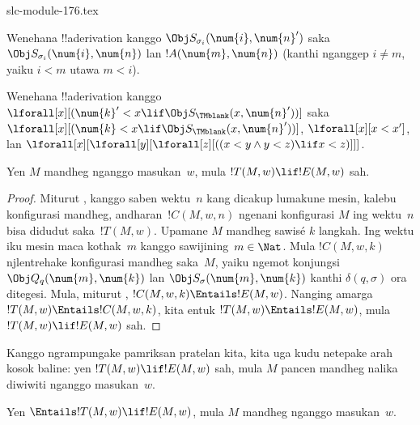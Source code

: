 \begin{filecontents*}[overwrite]{slc-module-176.tex}
\begin{prob}
 Wenehana !!a{derivation} kanggo
$\Obj S_{\sigma_i}(\num{i}, \num{n}')$
saka $\Obj S_{\sigma_i}(\num{i}, \num{n})$
lan $!A(\num{m}, \num{n})$ (kanthi nganggep $i \neq m$,
yaiku $i < m$ utawa $m < i$).
\end{prob}

\begin{prob}
Wenehana !!a{derivation} kanggo
$\lforall[x][(\num{k}' < x \lif \Obj
  S_\TMblank(x, \num{n}'))]$ saka
$\lforall[x][(\num{k} < x \lif \Obj
  S_\TMblank(x, \num{n}'))]$,
$\lforall[x][x < x']$, lan
$\lforall[x][\lforall[y][\lforall[z][ ((x < y \land y < z) \lif x <
      z)]]]$.
\end{prob}


\begin{lem}
Yen $M$ mandheg nganggo masukan~$w$,
mula $!T(M, w) \lif !E(M, w)$ sah.
\end{lem}

\begin{proof}
Miturut , kanggo saben
wektu~$n$ kang dicakup lumakune mesin, kalebu konfigurasi mandheg, andharan~$!C(M, w, n)$
ngenani konfigurasi $M$ ing wektu~$n$
bisa didudut saka~$!T(M, w)$.
Upamane $M$ mandheg sawisé $k$ langkah.
Ing wektu iku mesin maca kothak~$m$
kanggo sawijining~$m \in \Nat$.
Mula $!C(M, w, k)$ njlentrehake
konfigurasi mandheg saka~$M$, yaiku
ngemot konjungsi $\Obj Q_q(\num{m}, \num{k})$
lan $\Obj S_\sigma(\num{m}, \num{k})$
kanthi $\delta(q,\sigma)$ ora ditegesi.
Mula, miturut ,
$!C(M, w, k) \Entails !E(M, w)$.
Nanging amarga $!T(M, w) \Entails !C(M, w, k)$,
kita entuk $!T(M, w) \Entails !E(M, w)$,
mula $!T(M, w) \lif !E(M, w)$ sah.
\end{proof}


\begin{explain} 
Kanggo ngrampungake pamriksan pratelan kita,
kita uga kudu netepake arah kosok baline:
yen $!T(M, w) \lif !E(M, w)$ sah,
mula $M$ pancen mandheg nalika diwiwiti
nganggo masukan~$w$.
\end{explain}

\begin{lem}
Yen $\Entails !T(M, w) \lif !E(M, w)$,
mula $M$ mandheg nganggo masukan~$w$.
\end{lem}


\end{filecontents*}
